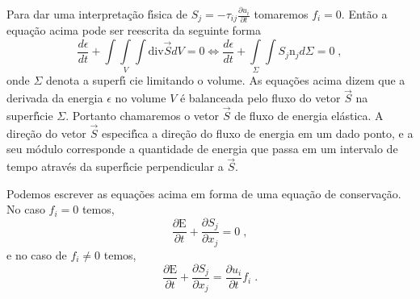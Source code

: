 Para dar uma interpreta\c{c}\~ao f\'\i sica de
$S_{j}=-\tau_{ij}\frac{\partial u_{i}}{\partial t}$ tomaremos
$f_{i}=0$. Ent\~ao a equa\c{c}\~ao acima pode ser reescrita da
seguinte forma
\begin{equation}
\frac{d\epsilon}{dt}+\int \! \!\int\limits_{V} \! \!\int \mbox{div} \vec{S}dV=0\Leftrightarrow
\frac{d\epsilon}{dt}+\int\limits_{\Sigma} \! \!\int
S_{j}\mbox{n}_{j}d\Sigma=0 \;,
\end{equation}
onde $\Sigma$ denota a superf\'\i
cie limitando o volume. As equa\c{c}\~oes acima dizem que a
derivada da energia $\epsilon$ no volume $V$ \'e balanceada pelo
fluxo do vetor $\vec{S}$ na superf\'\i cie $\Sigma$. Portanto
chamaremos o vetor $\vec{S}$ de fluxo de energia el\'astica. A
dire\c{c}\~ao do vetor $\vec{S}$ especif\'\i ca a dire\c{c}\~ao do
fluxo de energia em um dado ponto, e a seu m\'odulo corresponde a
quantidade de energia que passa em um intervalo de tempo atrav\'es
da superf\'\i cie perpendicular a $\vec{S}$.

Podemos escrever as equa\c{c}\~oes acima em forma de uma
equa\c{c}\~ao de conserva\c{c}\~ao. No caso $f_{i}=0$ temos,
\begin{equation}
\frac{\partial \mbox{E}}{\partial t}+\frac{\partial S_{j}}{\partial x_{j}}=0 \;,
\end{equation}
e no caso de $f_{i} \neq 0$ temos,
\begin{equation}
\frac{\partial \mbox{E}}{\partial t}+\frac{\partial S_{j}}{\partial x_{j}}=
\frac{\partial u_{i}}{\partial t}f_{i} \;.
\end{equation}









%
%
%
